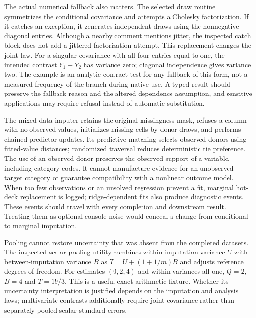 The actual numerical fallback also matters. The selected draw routine symmetrizes the conditional covariance and attempts a Cholesky factorization. If it catches an exception, it generates independent draws using the nonnegative diagonal entries. Although a nearby comment mentions jitter, the inspected catch block does not add a jittered factorization attempt. This replacement changes the joint law. For a singular covariance with all four entries equal to one, the intended contrast $Y_1-Y_2$ has variance zero; diagonal independence gives variance two. The example is an analytic contract test for any fallback of this form, not a measured frequency of the branch during native use. A typed result should preserve the fallback reason and the altered dependence assumption, and sensitive applications may require refusal instead of automatic substitution.~\citep{exec25_jtm_tetrad,exec25_jtm_choice}

The mixed-data imputer retains the original missingness mask, refuses a column with no observed values, initializes missing cells by donor draws, and performs chained predictor updates. Its predictive matching selects observed donors using fitted-value distances; randomized traversal reduces deterministic tie preference. The use of an observed donor preserves the observed support of a variable, including category codes. It cannot manufacture evidence for an unobserved target category or guarantee compatibility with a nonlinear outcome model. When too few observations or an unsolved regression prevent a fit, marginal hot-deck replacement is logged; ridge-dependent fits also produce diagnostic events. These events should travel with every completion and downstream result. Treating them as optional console noise would conceal a change from conditional to marginal imputation.~\citep{exec25_jtm_tetrad}

Pooling cannot restore uncertainty that was absent from the completed datasets. The inspected scalar pooling utility combines within-imputation variance $\bar U$ with between-imputation variance $B$ as $T=\bar U+(1+1/m)B$ and adjusts reference degrees of freedom. For estimates $(0,2,4)$ and within variances all one, $\bar Q=2$, $B=4$ and $T=19/3$. This is a useful exact arithmetic fixture. Whether its uncertainty interpretation is justified depends on the imputation and analysis laws; multivariate contrasts additionally require joint covariance rather than separately pooled scalar standard errors.~\citep{exec25_jtm_tetrad,exec25_jtm_choice}

